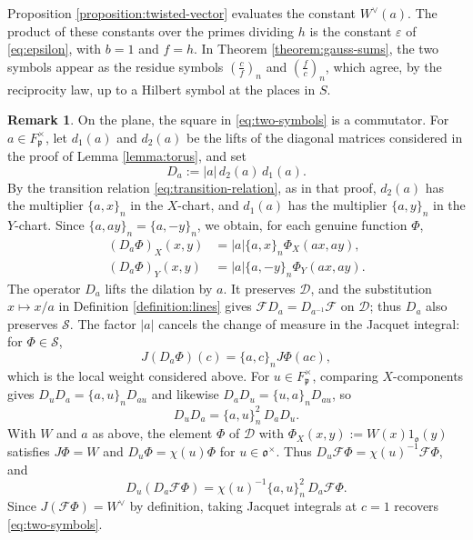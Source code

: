 \documentclass[reqno]{amsart}
\newcommand{\qr}[2]{\left( \frac{#1}{#2} \right)}
\theoremstyle{plain}
\theoremstyle{definition}
\newtheorem{remark}[theorem]{Remark}
\theoremstyle{itplain}
\numberwithin{equation}{section}
\numberwithin{theorem}{section}
\begin{document}
Proposition \ref{proposition:twisted-vector} evaluates the constant $W^\vee(a)$.  The product of these constants over the primes dividing $h$ is the constant $\varepsilon$ of \eqref{eq:epsilon}, with $b = 1$ and $f = h$.  In Theorem \ref{theorem:gauss-sums}, the two symbols appear as the residue symbols $\qr{c}{f}_n$ and $\qr{f}{c}_n$, which agree, by the reciprocity law, up to a Hilbert symbol at the places in $S$.

\begin{remark}\label{remark:lifted-dilations}
  On the plane, the square in \eqref{eq:two-symbols} is a commutator.  For $a \in F_{\mathfrak{p}}^\times$, let $d_1(a)$ and $d_2(a)$ be the lifts of the diagonal matrices considered in the proof of Lemma \ref{lemma:torus}, and set
  \begin{equation*}
    D_a := \lvert a \rvert \, d_2(a) \, d_1(a).
  \end{equation*}
  By the transition relation \eqref{eq:transition-relation}, as in that proof, $d_2(a)$ has the multiplier $\{a, x\}_n$ in the $X$-chart, and $d_1(a)$ has the multiplier $\{a, y\}_n$ in the $Y$-chart.  Since $\{a, a y\}_n = \{a, -y\}_n$, we obtain, for each genuine function $\Phi$,
  \begin{align*}
    (D_a \Phi)_X(x, y) &= \lvert a \rvert \{a, x\}_n \Phi_X(a x, a y), \\
    (D_a \Phi)_Y(x, y) &= \lvert a \rvert \{a, -y\}_n \Phi_Y(a x, a y).
  \end{align*}
  The operator $D_a$ lifts the dilation by $a$.  It preserves $\mathcal{D}$, and the substitution $x \mapsto x / a$ in Definition \ref{definition:lines} gives $\mathcal{F} D_a = D_{a^{-1}} \mathcal{F}$ on $\mathcal{D}$; thus $D_a$ also preserves $\mathcal{S}$.  The factor $\lvert a \rvert$ cancels the change of measure in the Jacquet integral: for $\Phi \in \mathcal{S}$,
  \begin{equation*}
    J(D_a \Phi)(c) = \{a, c\}_n J \Phi(a c),
  \end{equation*}
  which is the local weight considered above.  For $u \in F_{\mathfrak{p}}^\times$, comparing $X$-components gives $D_u D_a = \{a, u\}_n D_{a u}$ and likewise $D_a D_u = \{u, a\}_n D_{a u}$, so
  \begin{equation*}
    D_u D_a = \{a, u\}_n^2 \, D_a D_u.
  \end{equation*}
  With $W$ and $a$ as above, the element $\Phi$ of $\mathcal{D}$ with $\Phi_X(x, y) := W(x) 1_{\mathfrak{o}}(y)$ satisfies $J \Phi = W$ and $D_u \Phi = \chi(u) \Phi$ for $u \in \mathfrak{o}^\times$.  Thus $D_u \mathcal{F} \Phi = \chi(u)^{-1} \mathcal{F} \Phi$, and
  \begin{equation*}
    D_u (D_a \mathcal{F} \Phi) = \chi(u)^{-1} \{a, u\}_n^2 \, D_a \mathcal{F} \Phi.
  \end{equation*}
  Since $J(\mathcal{F} \Phi) = W^\vee$ by definition, taking Jacquet integrals at $c = 1$ recovers \eqref{eq:two-symbols}.
\end{remark}
\end{document}

